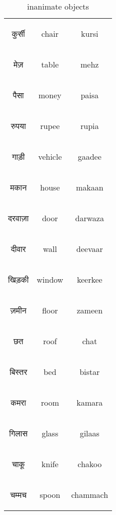 \begin{table}[H]
    \centering 
    \begin{tabular}{c|c|c}
        \begin{hindi} कुर्सी \end{hindi} & chair & kursi \\
        \begin{hindi} मेज़ \end{hindi} & table & mehz \\
        \begin{hindi} पैसा \end{hindi} & money & paisa \\
        \begin{hindi} रुपया \end{hindi} & rupee & rupia \\
        \begin{hindi} गाड़ी \end{hindi} & vehicle & gaadee \\
        \begin{hindi} मकान \end{hindi} & house & makaan \\
        \begin{hindi} दरवाज़ा \end{hindi} & door & darwaza \\
        \begin{hindi} दीवार \end{hindi} & wall & deevaar \\
        \begin{hindi} खिड़की \end{hindi} & window & keerkee \\
        \begin{hindi} ज़मीन \end{hindi} & floor & zameen \\
        \begin{hindi} छत \end{hindi} & roof & chat \\
        \begin{hindi} बिस्तर \end{hindi} & bed & bistar \\
        \begin{hindi} कमरा \end{hindi} & room & kamara \\
        \begin{hindi} गिलास \end{hindi} & glass & gilaas \\
        \begin{hindi} चाकू \end{hindi} & knife & chakoo \\
        \begin{hindi} चम्मच \end{hindi} & spoon & chammach \\
    \end{tabular}
    \caption{inanimate objects}
    \label{tab:nouns_inanimate}
\end{table}

